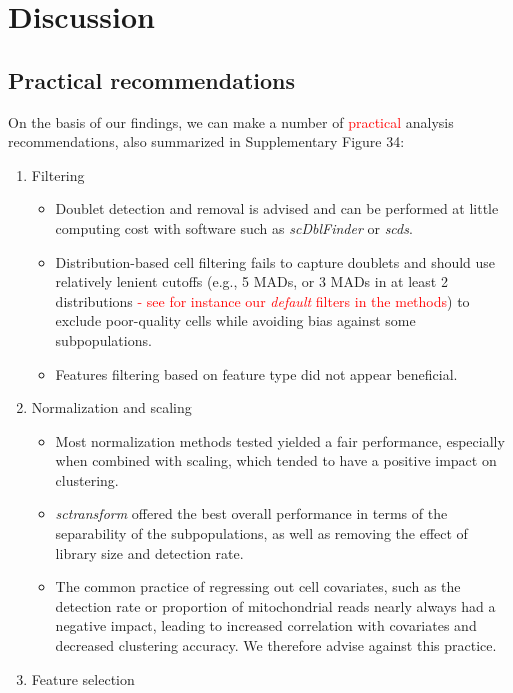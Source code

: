 \documentclass[11pt]{article}
\begin{document}
\section*{Discussion}

\subsection*{{\color{red}Practical} recommendations}

On the basis of our findings, we can make a number of \textcolor{red}{practical} analysis recommendations, also summarized in Supplementary Figure 34:

\begin{enumerate}
   \item Filtering
   \begin{itemize}
     \item Doublet detection and removal is advised and can be performed at little computing cost with software such as \textit{scDblFinder} or \textit{scds}.
     \item Distribution-based cell filtering fails to capture doublets and should use relatively lenient cutoffs (e.g., 5 MADs, or 3 MADs in at least 2 distributions \textcolor{red}{- see for instance our \textit{default} filters in the methods}) to exclude poor-quality cells while avoiding bias against some subpopulations.
     \item Features filtering based on feature type did not appear beneficial.
   \end{itemize}
   \item Normalization and scaling
   \begin{itemize}
     \item Most normalization methods tested yielded a fair performance, especially when combined with scaling, which tended to have a positive impact on clustering.
     \item \textit{sctransform} offered the best overall performance in terms of the separability of the subpopulations, as well as removing the effect of library size and detection rate.
     \item The common practice of regressing out cell covariates, such as the detection rate or proportion of mitochondrial reads nearly always had a negative impact, leading to increased correlation with covariates and decreased clustering accuracy. We therefore advise against this practice.
   \end{itemize}
   \item Feature selection

\end{enumerate}
\end{document}
